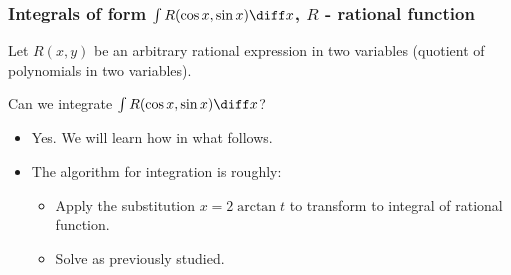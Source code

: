 \begin{frame}
\frametitle{Integrals of form $\int R(\cos x,\sin x) \diff x$, $R$ - rational function}

Let $R(x,y)$ be an arbitrary rational expression in two variables (quotient of polynomials in two variables).
\begin{question}
Can we integrate $\int R(\cos x, \sin x)\diff x$?
\end{question}
\begin{itemize}
\item<2-> Yes. We will learn how in what follows.
\item<3-> The algorithm for integration is roughly:
\begin{itemize}
\item<4-> Apply the substitution $x=2\arctan t$ to transform to integral of rational function.
\item<5-> Solve as previously studied.
\end{itemize}
\end{itemize}
\end{frame}
